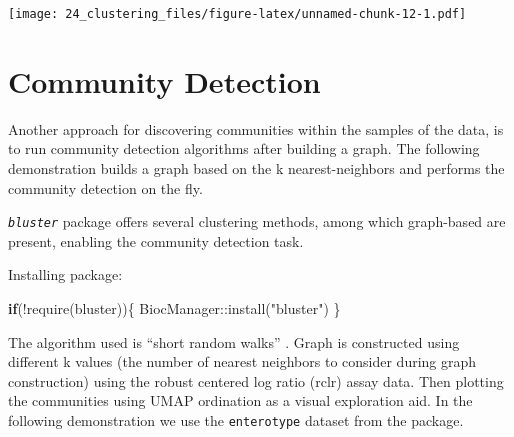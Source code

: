 \documentclass[
]{book}
\newenvironment{Shaded}{\begin{snugshade}}{\end{snugshade}}
\newcommand{\ControlFlowTok}[1]{\textcolor[rgb]{0.13,0.29,0.53}{\textbf{#1}}}
\newcommand{\FunctionTok}[1]{\textcolor[rgb]{0.00,0.00,0.00}{#1}}
\newcommand{\NormalTok}[1]{#1}
\newcommand{\SpecialCharTok}[1]{\textcolor[rgb]{0.00,0.00,0.00}{#1}}
\newcommand{\StringTok}[1]{\textcolor[rgb]{0.31,0.60,0.02}{#1}}
\begin{document}
\texttt{[image: 24\_clustering\_files/figure-latex/unnamed-chunk-12-1.pdf]}

\hypertarget{community-detection}{%
\section{Community Detection}\label{community-detection}}

Another approach for discovering communities within the samples of the
data, is to run community detection algorithms after building a
graph. The following demonstration builds a graph based on the k
nearest-neighbors and performs the community detection on the fly.

\emph{\texttt{bluster}} \citep{R-bluster} package offers several clustering methods,
among which graph-based are present, enabling the community detection
task.

Installing package:

\begin{Shaded}
\begin{Highlighting}[]
\ControlFlowTok{if}\NormalTok{(}\SpecialCharTok{!}\FunctionTok{require}\NormalTok{(bluster))\{}
\NormalTok{  BiocManager}\SpecialCharTok{::}\FunctionTok{install}\NormalTok{(}\StringTok{"bluster"}\NormalTok{)}
\NormalTok{\}}
\end{Highlighting}
\end{Shaded}

The algorithm used is ``short random walks'' \citep{Pons2006}. Graph is
constructed using different k values (the number of nearest neighbors
to consider during graph construction) using the robust centered log
ratio (rclr) assay data. Then plotting the communities using UMAP
\citep{McInnes2018} ordination as a visual exploration aid. In the
following demonstration we use the \texttt{enterotype} dataset from the
\citep{R-mia} package.
\end{document}
